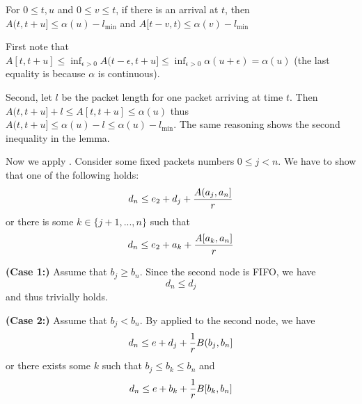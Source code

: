 \begin{lemma}
For $0\leq t, u$ and $0\leq v \leq t$, if
there is an arrival at $t$, then $A(t,t+u] \leq \alpha(u) -
l_{\min}$ and $A[t-v,t) \leq \alpha(v) - l_{\min}$
\end{lemma}
\begin{preuve} First note that $A[t,t+u]\leq \inf_{\epsilon
> 0} A(t-\epsilon, t+u]\leq \inf_{\epsilon > 0}
\alpha(u+\epsilon)=\alpha(u)$  (the last equality is because
$\alpha$ is continuous).

Second, let $l$ be the packet length for one packet arriving
at time $t$. Then
 $A(t,t+u]+l\leq A[t, t+u]\leq \alpha(u)$ thus $A(t,t+u]\leq \alpha(u)-l \leq \alpha(u) -
l_{\min}$. The same reasoning shows the second inequality in
the lemma. \end{preuve}

Now we apply . Consider some fixed
packets numbers $0\leq j<n$. We have to show that one of the
following holds:
\begin{equation}\mylabel{eq-psrgmaxplus1p}
 d_n \leq e_2 + d_j + \frac{A(a_j, a_n]}{r}
 \end{equation}
or there is some $k \in \{j+1, ..., n\}$ such that
\begin{equation}\mylabel{eq-psrgmaxplus2p}
 d_n \leq e_2 + a_k + \frac{A[a_k, a_n]}{r}
\end{equation}

\textbf{(Case 1:)} Assume that $b_j \geq b_n$. Since the
second node is FIFO, we have
$$
d_n \leq d_j
$$
and thus  trivially holds.

\textbf{(Case 2:)} Assume that $b_j < b_n$. By
 applied to the second node, we have
\begin{equation}\mylabel{eq-jpoiuwejfhn81}
  d_n \leq e+ d_j + \frac{1}{r} B(b_j,b_n]
\end{equation}
or there exists some $k$ such that $b_j \leq b_k \leq b_n$ and
\begin{equation}\mylabel{eq-jpoiuwejfhn82}
  d_n \leq e+ b_k + \frac{1}{r} B[b_k,b_n]
\end{equation}

